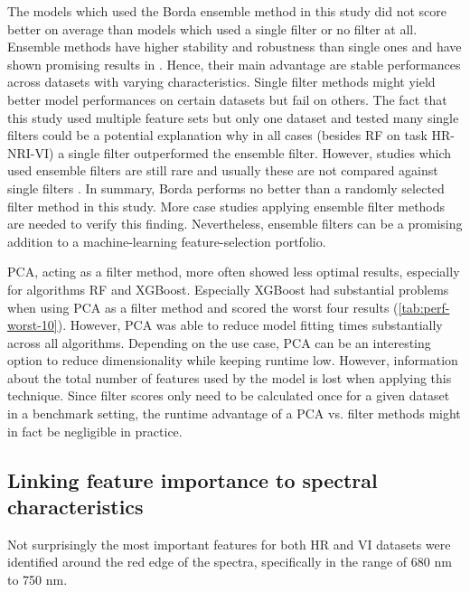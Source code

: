 \documentclass[peerreview]{IEEEtran}
\begin{document}
The models which used the Borda ensemble method in this study did not score better on average than models which used a single filter or no filter at all.
Ensemble methods have higher stability and robustness than single ones and have shown promising results in \cite{drotar2017a}.
Hence, their main advantage are stable performances across datasets with varying characteristics.
Single filter methods might yield better model performances on certain datasets but fail on others.
The fact that this study used multiple feature sets but only one dataset and tested many single filters could be a potential explanation why in all cases (besides RF on task HR-NRI-VI) a single filter outperformed the ensemble filter.
However, studies which used ensemble filters are still rare and usually these are not compared against single filters \cite{ghosh2019}.
In summary, Borda performs no better than a randomly selected filter method in this study.
More case studies applying ensemble filter methods are needed to verify this finding.
Nevertheless, ensemble filters can be a promising addition to a machine-learning feature-selection portfolio.

PCA, acting as a filter method, more often showed less optimal results, especially for algorithms RF and XGBoost.
Especially XGBoost had substantial problems when using PCA as a filter method and scored the worst four results (\autoref{tab:perf-worst-10}).
However, PCA was able to reduce model fitting times substantially across all algorithms.
Depending on the use case, PCA can be an interesting option to reduce dimensionality while keeping runtime low.
However, information about the total number of features used by the model is lost when applying this technique.
Since filter scores only need to be calculated once for a given dataset in a benchmark setting, the runtime advantage of a PCA vs. filter methods might in fact be negligible in practice.

\subsection{Linking feature importance to spectral characteristics}

Not surprisingly the most important features for both HR and VI datasets were identified around the red edge of the spectra, specifically in the range of 680 nm to 750 nm.
\end{document}
